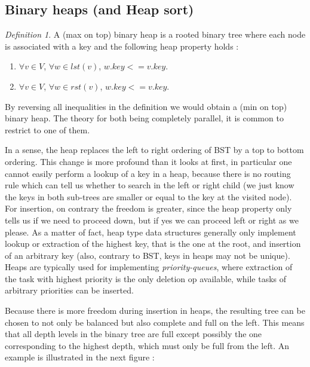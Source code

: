 \documentclass[12pt]{article}
\theoremstyle{plain}
\theoremstyle{remark}
\newtheorem*{definition}{Definition}
\begin{document}
\subsection{Binary heaps (and Heap sort)}

\begin{definition}
	A (max on top) binary heap is a rooted binary tree where each node is associated with 
	a key and the following heap property holds :
	\begin{enumerate}
		\item $\forall v \in V$, $\forall w \in lst(v)$, $w.key <=
			v.key$.
		\item $\forall v \in V$, $\forall w \in rst(v)$, $w.key <=
			v.key$.
	\end{enumerate}
\end{definition}

By reversing all inequalities in the definition we would obtain a (min on top)
binary heap. The theory for both being completely parallel, it is common to
restrict to one of them. 

\medskip

In a sense, the heap replaces the left to right ordering of BST by a top to
bottom ordering. This change is more profound than it looks at first, in
particular one cannot easily perform a lookup of a key in a heap, because
there is no routing rule which can tell us whether to search in the left or
right child (we just know the keys in both sub-trees are smaller or equal to the
key at the visited node). For insertion, on contrary the freedom is greater,
since the heap property only tells us if we need to proceed down, but if yes we
can proceed left or right as we please. As a matter of fact, heap type data 
structures generally only implement lookup or extraction of the highest key, that is the one at the
root, and insertion of an arbitrary key (also, contrary to BST, keys in heaps may
not be unique). Heaps are typically used for implementing {\it priority-queues}, where extraction
of the task with highest priority is the only deletion op available, while
tasks of arbitrary priorities can be inserted.

\medskip

Because there is more freedom during insertion in heaps, the resulting tree can
be chosen to not only be balanced but also complete and full on the left. This means 
that all depth levels in the binary tree are full except possibly the one  
corresponding to the highest depth, which must only be full from the left.
An example is illustrated in the next figure :
\end{document}
